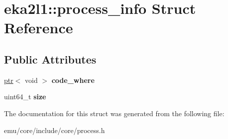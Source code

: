 \hypertarget{structeka2l1_1_1process__info}{}\section{eka2l1\+:\+:process\+\_\+info Struct Reference}
\label{structeka2l1_1_1process__info}
\subsection*{Public Attributes}
\begin{DoxyCompactItemize}
\item 
\mbox{\label{structeka2l1_1_1process__info_a88d475e1164a19359ee41beb3e329fd5}} 
\mbox{\hyperlink{classeka2l1_1_1ptr}{ptr}}$<$ void $>$ {\bfseries code\+\_\+where}
\item 
\mbox{\label{structeka2l1_1_1process__info_ab98bbd7480eaf1f5f5aa43e61a870e9e}} 
uint64\+\_\+t {\bfseries size}
\end{DoxyCompactItemize}


The documentation for this struct was generated from the following file\+:\begin{DoxyCompactItemize}
\item 
emu/core/include/core/process.\+h\end{DoxyCompactItemize}
